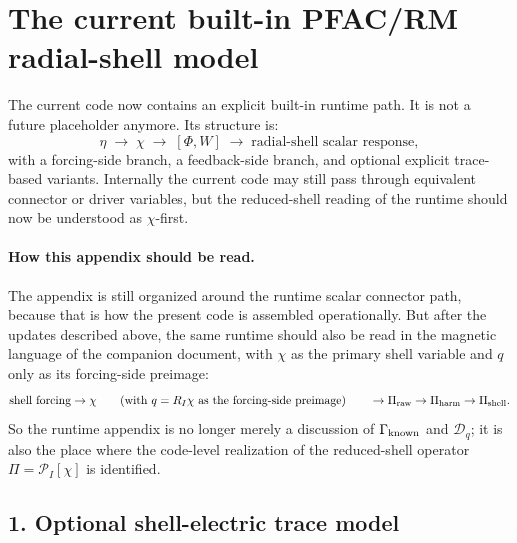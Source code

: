 \documentclass[11pt,a4paper]{article}
\begin{document}
\appendix

\section{The current built-in PFAC/RM radial-shell model}

The current code now contains an explicit built-in
 runtime path. It is not a future placeholder anymore.
Its structure is:
\begin{equation}
\eta
\;\to\;
\chi
\;\to\;
[\Phi, W]
\;\to\;
\text{radial-shell scalar response},
\label{eq:runtime_radial_chain}
\end{equation}
with a forcing-side branch, a feedback-side branch, and optional explicit
trace-based variants. Internally the current code may still pass through
equivalent connector or driver variables, but the reduced-shell reading of the
runtime should now be understood as \(\chi\)-first.

\paragraph{How this appendix should be read.}
The appendix is still organized around the runtime scalar connector path,
because that is how the present code is assembled operationally. But after the
updates described above, the same runtime should also be read in the magnetic
language of the companion document, with \(\chi\) as the primary shell
variable and \(q\) only as its forcing-side preimage:
\[
\text{shell forcing} \to \chi
\qquad
(\text{with } q = R_I \chi \text{ as the forcing-side preimage})
\qquad
\to \Pi_{\rm raw} \to \Pi_{\rm harm} \to \Pi_{\rm shell}.
\]
So the runtime appendix is no longer merely a discussion of \(\Gamma_{\rm known}\)
and \(\mathcal D_q\); it is also the place where the code-level realization of
the reduced-shell operator \(\Pi=\mathcal P_I[\chi]\) is identified.

\subsection*{1. Optional shell-electric trace model}
\end{document}
